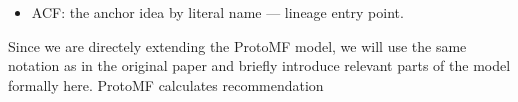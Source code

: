 \begin{itemize}
    \item ACF: the anchor idea by literal name — lineage entry point.
\end{itemize}

Since we are directely extending the ProtoMF model, we will use the 
same notation as in the original paper and briefly introduce relevant parts of the model formally here.
ProtoMF calculates recommendation 


